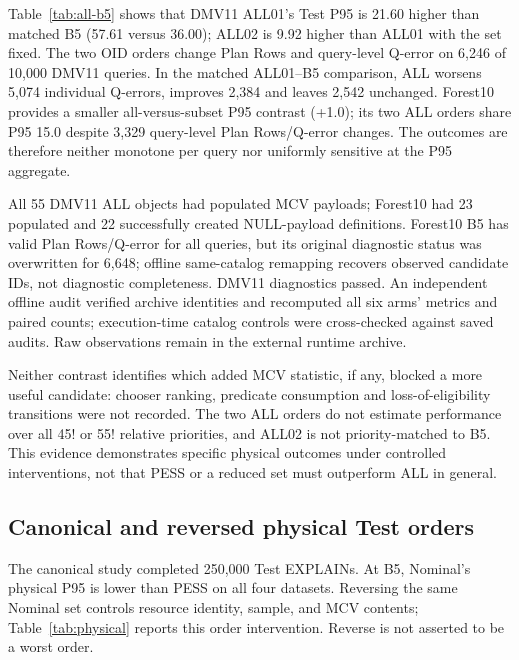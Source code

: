 \documentclass[sigconf, nonacm]{acmart}
\begin{document}
Table~\ref{tab:all-b5} shows that DMV11 ALL01's Test P95 is
21.60 higher than matched B5 (57.61 versus 36.00); ALL02 is
9.92 higher than ALL01 with the set fixed.
The two OID orders change Plan Rows and query-level Q-error
on 6,246 of 10,000 DMV11 queries. In the matched
ALL01--B5 comparison, ALL worsens 5,074 individual
Q-errors, improves 2,384 and leaves 2,542 unchanged.
Forest10 provides a smaller all-versus-subset P95
contrast (+1.0); its two ALL orders share P95 15.0
despite 3,329 query-level Plan Rows/Q-error changes.
The outcomes are therefore neither monotone per query
nor uniformly sensitive at the P95 aggregate.

All 55 DMV11 ALL objects had populated MCV payloads; Forest10 had
23 populated and 22 successfully created NULL-payload definitions.
Forest10 B5 has valid Plan Rows/Q-error for all queries, but its
original diagnostic status was overwritten for 6,648; offline
same-catalog remapping recovers observed candidate IDs, not
diagnostic completeness. DMV11 diagnostics passed. An independent
offline audit verified archive identities and recomputed all six arms'
metrics and paired counts; execution-time catalog controls were
cross-checked against saved audits. Raw observations remain in the
external runtime archive.

Neither contrast identifies which added MCV statistic,
if any, blocked a more useful candidate: chooser ranking,
predicate consumption and loss-of-eligibility transitions
were not recorded. The two ALL orders do not estimate
performance over all 45! or 55! relative priorities,
and ALL02 is not priority-matched to B5. This evidence
demonstrates specific physical outcomes under controlled
interventions, not that PESS or a reduced set must
outperform ALL in general.

\subsection{Canonical and reversed physical Test orders}
The canonical study completed 250,000 Test EXPLAINs. At B5,
Nominal's physical P95 is lower than PESS on all four datasets.
Reversing the same Nominal set controls resource identity, sample,
and MCV contents; Table~\ref{tab:physical} reports this order
intervention. Reverse is not asserted to be a worst order.
\end{document}
